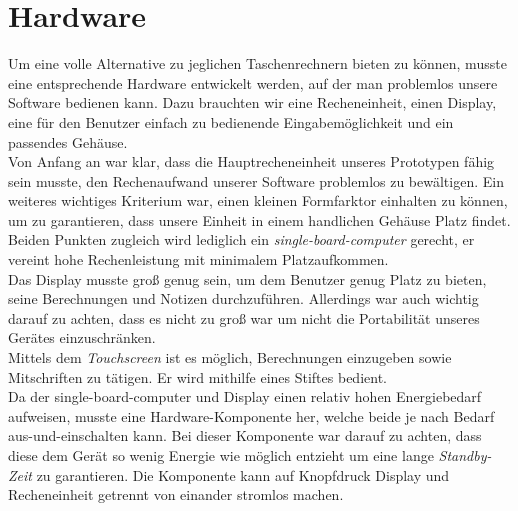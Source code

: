 \section{Hardware}
Um eine volle Alternative zu jeglichen Taschenrechnern bieten zu können, musste eine entsprechende Hardware entwickelt werden, auf der man problemlos unsere Software bedienen kann. Dazu brauchten wir eine Recheneinheit, einen Display, eine für den Benutzer einfach zu bedienende Eingabemöglichkeit und ein passendes Gehäuse.\\

Von Anfang an war klar, dass die Hauptrecheneinheit unseres Prototypen fähig sein musste, den Rechenaufwand unserer Software problemlos zu bewältigen. Ein weiteres wichtiges Kriterium war, einen kleinen Formfarktor einhalten zu können, um zu garantieren, dass unsere Einheit in einem handlichen Gehäuse Platz findet. Beiden Punkten zugleich wird lediglich ein \textit{single-board-computer} gerecht, er vereint hohe Rechenleistung mit minimalem Platzaufkommen.\\

Das Display musste groß genug sein, um dem Benutzer genug Platz zu bieten, seine Berechnungen und Notizen durchzuführen. Allerdings war auch wichtig darauf zu achten, dass es nicht zu groß war um nicht die Portabilität unseres Gerätes einzuschränken.\\

Mittels dem \textit{Touchscreen} ist es möglich, Berechnungen einzugeben sowie Mitschriften zu tätigen. Er wird mithilfe eines Stiftes bedient.\\

Da der single-board-computer und Display einen relativ hohen Energiebedarf aufweisen, musste eine Hardware-Komponente her, welche beide je nach Bedarf aus-und-einschalten kann. Bei dieser Komponente war darauf zu achten, dass diese dem Gerät so wenig Energie wie möglich entzieht um eine lange \textit{Standby-Zeit} zu garantieren. Die Komponente kann auf Knopfdruck Display und Recheneinheit getrennt von einander stromlos machen.\\

